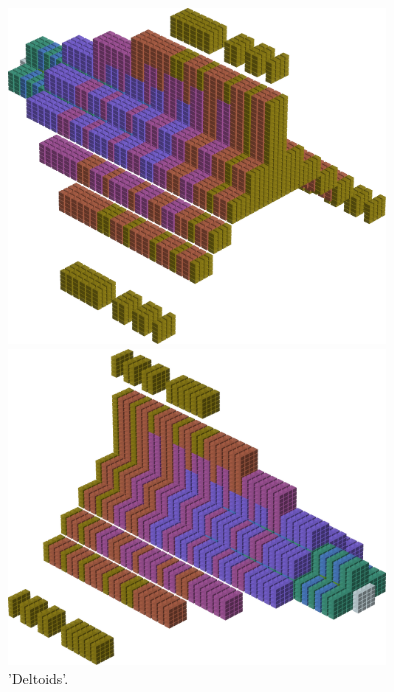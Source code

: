 \clearpage
\begin{figure}[H]
    \centering
    \begin{adjustbox}{width=10cm,center}
      \includegraphics[width=10cm]{src/colorspace_patterns/pattern3-45.png}%
    \end{adjustbox}
    \begin{adjustbox}{width=10cm}
      \includegraphics[width=10cm]{src/colorspace_patterns/pattern3-225.png}%
    \end{adjustbox}
\caption{'Deltoids'.}
\end{figure}

